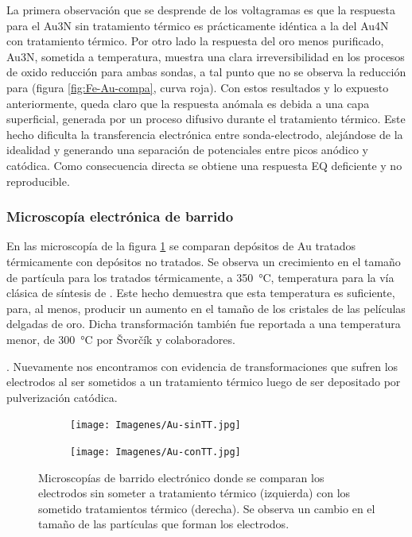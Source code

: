 {			La primera observación que se desprende de los voltagramas es que la respuesta para el Au3N sin tratamiento térmico es prácticamente idéntica a la del Au4N con tratamiento térmico. Por otro lado la respuesta del oro menos purificado, Au3N, sometida a temperatura, muestra una clara irreversibilidad en los procesos de oxido reducción para ambas sondas, a tal punto que no se observa la reducción para \ferroferri\space (figura \ref{fig:Fe-Au-compa}, curva roja). Con estos resultados y lo expuesto anteriormente, queda claro que la respuesta anómala es debida a una capa superficial, generada por un proceso difusivo durante el tratamiento térmico. Este hecho dificulta la transferencia electrónica entre sonda-electrodo, alejándose de la idealidad y generando una separación de potenciales entre picos anódico y catódica. Como consecuencia directa se obtiene una respuesta EQ deficiente y no reproducible.  
			
    	\subsubsection{Microscopía electrónica de barrido}
			  		
			 En las microscopía de la figura \ref{fig:Au_compTT} se comparan depósitos de Au tratados térmicamente con depósitos no tratados. Se observa un crecimiento en el tamaño de partícula para los tratados térmicamente, a \SI{350}{\celsius}, temperatura para la vía clásica de síntesis de \pdm. Este hecho demuestra que esta temperatura es suficiente, para, al menos, producir un aumento en el tamaño de los cristales de las películas delgadas de oro. Dicha transformación también fue reportada a una temperatura menor, de \SI{300}{\celsius} por \v{S}vor\v{c}\'ik y colaboradores.}\cite{Svorcik2010}. Nuevamente nos encontramos con evidencia de transformaciones que sufren los electrodos al ser sometidos a un tratamiento térmico luego de ser depositado por pulverización catódica.

			 		\begin{figure}[th]
		 	   	    \begin{subfigure}[t]{0.49\textwidth}
			       	\texttt{[image: Imagenes/Au-sinTT.jpg]}
			   		\end{subfigure}
			   		\begin{subfigure}[t]{0.49\textwidth}
			   	    \texttt{[image: Imagenes/Au-conTT.jpg]}
			   		\end{subfigure}
					 \caption[Microscopía comparativa electrodos Au]{Microscopías de barrido electrónico donde se comparan los electrodos sin someter a tratamiento térmico (izquierda) con los sometido tratamientos térmico (derecha). Se observa un cambio en el tamaño de las partículas que forman los electrodos.}
					 \label{fig:Au_compTT}	
				     \end{figure}
		 		 		
